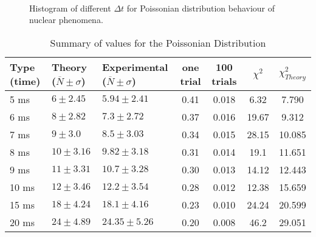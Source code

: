 \documentclass[a4paper,12pt,oneside]{article}
\begin{document}
\begin{figure}[h!]
	\centering

	\\
	\\
	\\
	\label{figur}\caption{Histogram of different $\Delta t$ for Poissonian distribution behaviour of nuclear phenomena.}
\end{figure}

\begin{table}[h!]
\centering
	\begin{tabular}{|p{2cm}|p{2cm}|p{3cm}|c|c|c|c|}
		 \hline
		 Type (time) & Theory ($\overline{N}\pm\sigma$)& Experimental ($\overline{N}\pm\sigma$) & one trial & 100 trials & $\chi^2$  & $\chi^2_{Theory}$\\
		\hline
		 5 ms & $6\pm 2.45$ & $5.94\pm 2.41$ & 0.41 & 0.018 & 6.32 & 7.790\\
		 6 ms & $8\pm 2.82$ & $7.3\pm 2.72$ & 0.37 & 0.016 & 19.67 & 9.312\\
		 7 ms & $9\pm 3.0$ & $8.5\pm 3.03$ & 0.34 & 0.015 & 28.15 & 10.085\\
		 8 ms & $10\pm 3.16$ & $9.82\pm 3.18$ & 0.31 & 0.014 & 19.1 & 11.651\\
		 9 ms & $11\pm 3.31$ & $10.7\pm 3.28$ & 0.30 & 0.013 & 14.12 & 12.443\\
		 10 ms & $12\pm 3.46$ & $12.2\pm 3.54$ & 0.28 & 0.012 & 12.38 & 15.659\\
		 15 ms & $18\pm 4.24$ & $18.1\pm 4.16$ & 0.23 & 0.010 & 24.24 & 20.599\\
		 20 ms & $24\pm 4.89$ & $24.35\pm 5.26$ & 0.20 & 0.008 & 46.2 & 29.051\\
		\hline
	\end{tabular}
	\caption{Summary of values for the Poissonian Distribution}
	\label{tab:poisson}
\end{table}
\end{document}
